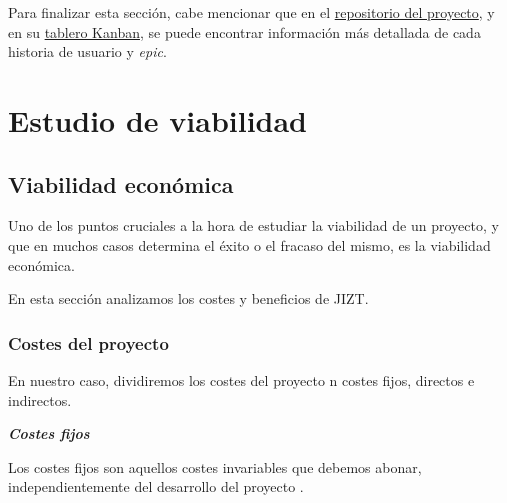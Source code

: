 Para finalizar esta sección, cabe mencionar que en el \href{https://github.com/dmlls/jizt/milestones}{repositorio del proyecto}, y en su \href{https://board.jizt.it/public/board/c08ea3322e2876652a0581e79d6430e2dc0c27720d8a06d7853e84c3cd2b}{tablero Kanban}, se puede encontrar información más detallada de cada historia de usuario y \emph{epic}.

\newpage

\section{Estudio de viabilidad}

\subsection{Viabilidad económica}

Uno de los puntos cruciales a la hora de estudiar la viabilidad de un proyecto, y que en muchos casos determina el éxito o el fracaso del mismo, es la viabilidad económica.

En esta sección analizamos los costes y beneficios de JIZT.


\subsubsection{Costes del proyecto}

En nuestro caso, dividiremos los costes del proyecto n costes fijos, directos e indirectos.

\vspace{0.4cm}
\noindent
\textbf{\emph{Costes fijos}}

Los costes fijos son aquellos costes invariables que debemos abonar, independientemente del desarrollo del proyecto \cite{perez18}.

